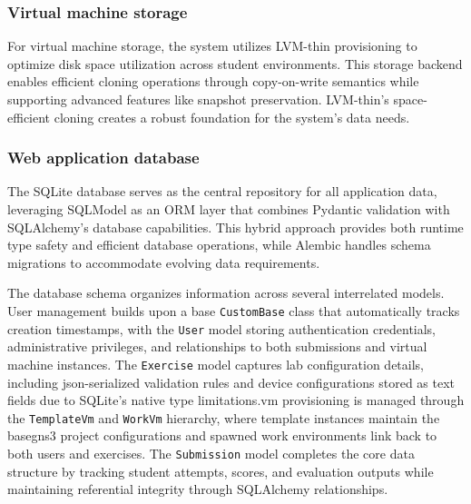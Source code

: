        \subsubsection{Virtual machine storage}

            For virtual machine storage, the system utilizes LVM-thin provisioning to optimize disk space utilization across student environments. 
            This storage backend enables efficient cloning operations through copy-on-write semantics while supporting advanced features like snapshot 
            preservation. LVM-thin's space-efficient cloning creates a robust foundation for the system's data needs.

        \subsubsection{Web application database}

            The SQLite database serves as the central repository for all application data, leveraging SQLModel as an ORM layer that combines Pydantic 
            validation with SQLAlchemy's database capabilities. This hybrid approach provides both runtime type safety and efficient database operations, 
            while Alembic handles schema migrations to accommodate evolving data requirements.

            The database schema organizes information across several interrelated models. User management builds upon a base \texttt{CustomBase} class 
            that automatically tracks creation timestamps, with the \texttt{User} model storing authentication credentials, administrative privileges, 
            and relationships to both submissions and virtual machine instances. The \texttt{Exercise} model captures lab configuration details, including 
            \ac{json}-serialized validation rules and device configurations stored as text fields due to SQLite's native type limitations.\ac{vm} 
            provisioning is managed through the \texttt{TemplateVm} and \texttt{WorkVm} hierarchy, where template instances maintain the base\ac{gns3} 
            project configurations and spawned work environments link back to both users and exercises. The \texttt{Submission} model completes the 
            core data structure by tracking student attempts, scores, and evaluation outputs while maintaining referential integrity through SQLAlchemy relationships.